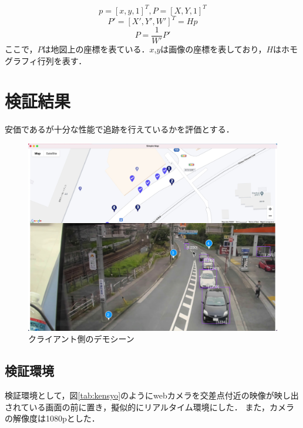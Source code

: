 \documentclass[technicalreport]{ieicej}
\begin{document}
\begin{equation}
  p = [x, y, 1]^T, P = [X, Y, 1]^T
\end{equation}
\begin{equation}
  P' = [X', Y', W']^T = Hp
\end{equation}
\begin{equation}
  P = \frac{1}{W'}P'
\end{equation}
ここで，$P$は地図上の座標を表ている．$x$,$y$は画像の座標を表しており，$H$はホモグラフィ行列を表す．

\section{検証結果}
安価であるが十分な性能で追跡を行えているかを評価とする．

\begin{figure}[t]
  \includegraphics*[bb=0 0 3000 2200, width=1\linewidth]{./images/demo.jpg}
  \caption{クライアント側のデモシーン}
  \label{tab:demo}
\end{figure}

\subsection{検証環境}
検証環境として，図\ref{tab:kensyo}のようにwebカメラを交差点付近の映像が映し出されている画面の前に置き，擬似的にリアルタイム環境にした．
また，カメラの解像度は1080pとした．
\end{document}
